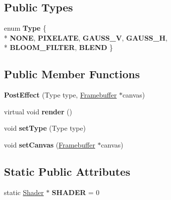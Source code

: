 \subsection*{Public Types}
\begin{DoxyCompactItemize}
\item 
\hypertarget{class_post_effect_aaccca6b80298db481b888abe761b0484}{}enum {\bfseries Type} \{ \\*
{\bfseries N\+O\+N\+E}, 
{\bfseries P\+I\+X\+E\+L\+A\+T\+E}, 
{\bfseries G\+A\+U\+S\+S\+\_\+\+V}, 
{\bfseries G\+A\+U\+S\+S\+\_\+\+H}, 
\\*
{\bfseries B\+L\+O\+O\+M\+\_\+\+F\+I\+L\+T\+E\+R}, 
{\bfseries B\+L\+E\+N\+D}
 \}\label{class_post_effect_aaccca6b80298db481b888abe761b0484}

\end{DoxyCompactItemize}
\subsection*{Public Member Functions}
\begin{DoxyCompactItemize}
\item 
\hypertarget{class_post_effect_a9e0e5cc2f6c226befa474e9275ed65da}{}{\bfseries Post\+Effect} (Type type, \hyperlink{class_framebuffer}{Framebuffer} $\ast$canvas)\label{class_post_effect_a9e0e5cc2f6c226befa474e9275ed65da}

\item 
\hypertarget{class_post_effect_a7274d736bac1655cc0e38e5fdf0dcf20}{}virtual void {\bfseries render} ()\label{class_post_effect_a7274d736bac1655cc0e38e5fdf0dcf20}

\item 
\hypertarget{class_post_effect_a79e9feb3a6a7f9a6d7d386edf80045a9}{}void {\bfseries set\+Type} (Type type)\label{class_post_effect_a79e9feb3a6a7f9a6d7d386edf80045a9}

\item 
\hypertarget{class_post_effect_a9a95d6d2be5272def9d246d1be702a72}{}void {\bfseries set\+Canvas} (\hyperlink{class_framebuffer}{Framebuffer} $\ast$canvas)\label{class_post_effect_a9a95d6d2be5272def9d246d1be702a72}

\end{DoxyCompactItemize}
\subsection*{Static Public Attributes}
\begin{DoxyCompactItemize}
\item 
\hypertarget{class_post_effect_ac3d05fdd220022ed1fe991488e246f4f}{}static \hyperlink{class_shader}{Shader} $\ast$ {\bfseries S\+H\+A\+D\+E\+R} = 0\label{class_post_effect_ac3d05fdd220022ed1fe991488e246f4f}

\end{DoxyCompactItemize}
